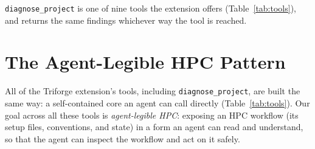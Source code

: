 \documentclass[conference]{IEEEtran}
\begin{document}
\texttt{diagnose\_project} is one of nine tools the extension offers (Table~\ref{tab:tools}), and
returns the same findings whichever way the tool is reached.

\begin{table}[!t]
\caption{The Triforge extension's agent tool set, exposed identically on the MCP and in-editor
surfaces. \texttt{diagnose\_project} (this paper's focus) and \texttt{explain\_triton} are
read-only; $^\ddagger$ marks state-changing tools gated behind an approval handshake; the rest
write project-local files without a gate.}
\label{tab:tools}
\centering
\footnotesize
{}
\end{table}

\section{The Agent-Legible HPC Pattern}
\label{sec:pattern}

All of the Triforge extension's tools, including \texttt{diagnose\_project}, are built the same way: a self-contained
core an agent can call directly (Table~\ref{tab:tools}). Our
goal across all these tools is \emph{agent-legible HPC}: exposing an HPC workflow (its setup
files, conventions, and state) in a form an agent can read and understand, so that the agent can
inspect the workflow and act on it safely.
\end{document}
